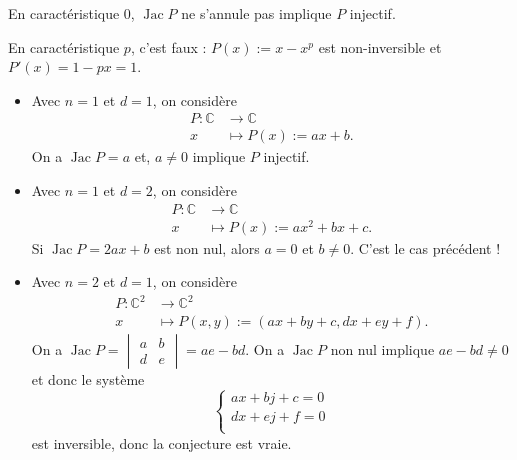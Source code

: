 \documentclass[./main]{subfiles}
\begin{document}
  \begin{rmk}
    En caractéristique $0$, $\operatorname{Jac} P$ ne s'annule pas implique  $P$ injectif.
  \end{rmk}

  \begin{rmk}
    En caractéristique $p$, c'est faux : $P(x) := x - x^p$ est non-inversible et  $P'(x) = 1 - px = 1$.
  \end{rmk}

  \begin{exm}
    \begin{itemize}
      \item Avec $n = 1$ et $d = 1$, on considère
        \begin{align*}
          P: \mathds{C} &\longrightarrow \mathds{C} \\
          x &\longmapsto P(x) := ax + b
        .\end{align*}
        On a $\operatorname{Jac} P = a$ et,  $a \neq 0$ implique $P$ injectif.
      \item Avec $n = 1$ et $d = 2$, on considère
        \begin{align*}
          P: \mathds{C} &\longrightarrow \mathds{C} \\
          x &\longmapsto P(x) := ax^2 + bx + c
        .\end{align*}
        Si $\operatorname{Jac} P = 2ax + b$ est non nul, alors $a = 0$ et $b \neq 0$.
        C'est le cas précédent !
      \item Avec $n = 2$ et $d = 1$, on considère
        \begin{align*}
          P: \mathds{C}^2 &\longrightarrow \mathds{C}^2 \\
          x &\longmapsto P(x,y) := (ax + by +c, dx + ey + f)
        .\end{align*}
        On a $\operatorname{Jac} P = \begin{vmatrix} a & b \\ d & e \end{vmatrix} = ae - bd$.
        On a $\operatorname{Jac} P$ non nul implique  $ae - bd \neq 0$ et donc le système 
        \[
        \begin{cases}
          ax + bj + c = 0\\
          dx + ej + f = 0\\
        \end{cases}
        \] est inversible, donc la conjecture est vraie.
    \end{itemize}
  \end{exm}
\end{document}
